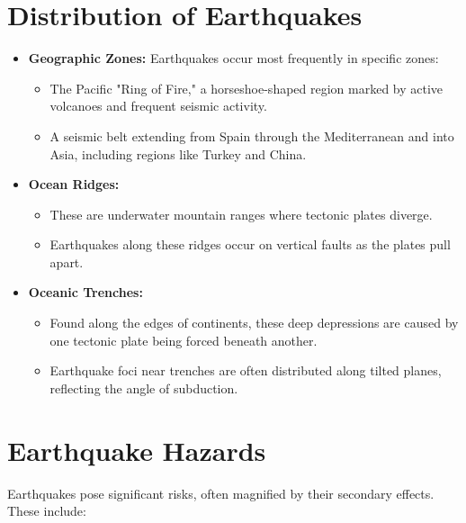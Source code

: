 \documentclass[12pt]{article}
\begin{document}
\section*{Distribution of Earthquakes}
\begin{itemize}
    \item \textbf{Geographic Zones:} Earthquakes occur most frequently in specific zones:
    \begin{itemize}
        \item The Pacific "Ring of Fire," a horseshoe-shaped region marked by active volcanoes and frequent seismic activity.
        \item A seismic belt extending from Spain through the Mediterranean and into Asia, including regions like Turkey and China.
    \end{itemize}
    \item \textbf{Ocean Ridges:}
    \begin{itemize}
        \item These are underwater mountain ranges where tectonic plates diverge.
        \item Earthquakes along these ridges occur on vertical faults as the plates pull apart.
    \end{itemize}
    \item \textbf{Oceanic Trenches:}
    \begin{itemize}
        \item Found along the edges of continents, these deep depressions are caused by one tectonic plate being forced beneath another.
        \item Earthquake foci near trenches are often distributed along tilted planes, reflecting the angle of subduction.
    \end{itemize}
\end{itemize}

\section*{Earthquake Hazards}
Earthquakes pose significant risks, often magnified by their secondary effects. These include:
\end{document}
